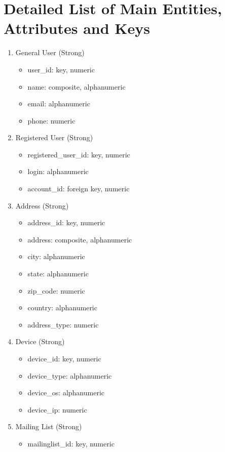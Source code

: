 \documentclass{article}
\let\oldsection\section
\renewcommand\section{\clearpage\oldsection}
\begin{document}
\section{Detailed List of Main Entities, Attributes and Keys}

\begin{enumerate}
\item General User (Strong)
    \begin{itemize}
        \item user\_id: key, numeric
        \item name: composite, alphanumeric
        \item email: alphanumeric
        \item phone: numeric
    \end{itemize}
\item Registered User (Strong)
    \begin{itemize}
        \item registered\_user\_id: key, numeric
        \item login: alphanumeric
        \item account\_id: foreign key, numeric
    \end{itemize}
\item Address (Strong)
    \begin{itemize}
        \item address\_id: key, numeric
        \item address: composite, alphanumeric
        \item city: alphanumeric
        \item state: alphanumeric
        \item zip\_code: numeric
        \item country: alphanumeric
        \item address\_type: numeric
    \end{itemize}
\item Device (Strong)
    \begin{itemize}
        \item device\_id: key, numeric
        \item device\_type: alphanumeric
        \item device\_os: alphanumeric
        \item device\_ip: numeric
    \end{itemize}
\item Mailing List (Strong)
    \begin{itemize}
        \item mailinglist\_id: key, numeric

\end{itemize}
\end{enumerate}
\end{document}
